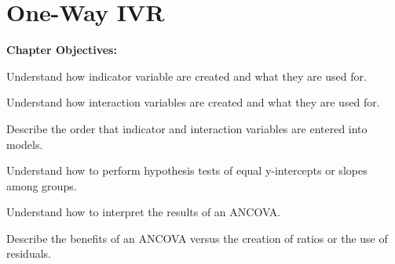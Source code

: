 \documentclass[10pt,openany]{book}\usepackage[]{graphicx}\usepackage[]{color}
\begin{document}
\chapter{One-Way IVR}  \label{chap:LMRegression2}
  \vspace{0pt}
    \begin{ChapObj}{\boxwidth}
      \textbf{Chapter Objectives:}
        \begin{Enumerate}
          \item Understand how indicator variable are created and what they are used for.
          \item Understand how interaction variables are created and what they are used for.
          \item Describe the order that indicator and interaction variables are entered into models.
          \item Understand how to perform hypothesis tests of equal y-intercepts or slopes among groups.
          \item Understand how to interpret the results of an ANCOVA.
          \item Describe the benefits of an ANCOVA versus the creation of ratios or the use of residuals.
        \end{Enumerate}
    \end{ChapObj}

\minitoc
\newpage
\end{document}
